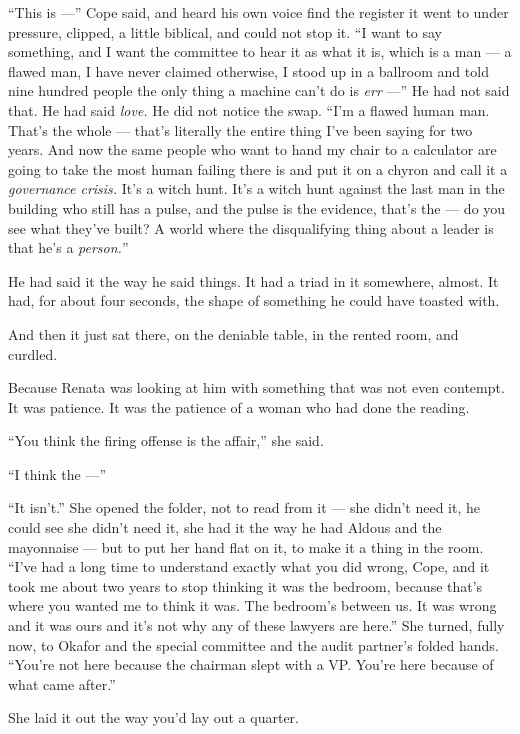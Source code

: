 \documentclass[11pt,openany]{book}
\newcommand{\scenebreak}{\par\vspace{0.5\baselineskip}\begin{center}\textasteriskcentered\quad\textasteriskcentered\quad\textasteriskcentered\end{center}\vspace{0.5\baselineskip}\par}
\begin{document}
``This is ---'' Cope said, and heard his own voice find the register it went to under pressure, clipped, a little biblical, and could not stop it. ``I want to say something, and I want the committee to hear it as what it is, which is a man --- a flawed man, I have never claimed otherwise, I stood up in a ballroom and told nine hundred people the only thing a machine can't do is \textit{err} ---'' He had not said that. He had said \textit{love.} He did not notice the swap. ``I'm a flawed human man. That's the whole --- that's literally the entire thing I've been saying for two years. And now the same people who want to hand my chair to a calculator are going to take the most human failing there is and put it on a chyron and call it a \textit{governance crisis.} It's a witch hunt. It's a witch hunt against the last man in the building who still has a pulse, and the pulse is the evidence, that's the --- do you see what they've built? A world where the disqualifying thing about a leader is that he's a \textit{person.}''

He had said it the way he said things. It had a triad in it somewhere, almost. It had, for about four seconds, the shape of something he could have toasted with.

And then it just sat there, on the deniable table, in the rented room, and curdled.

Because Renata was looking at him with something that was not even contempt. It was patience. It was the patience of a woman who had done the reading.

``You think the firing offense is the affair,'' she said.

``I think the ---''

``It isn't.'' She opened the folder, not to read from it --- she didn't need it, he could see she didn't need it, she had it the way he had Aldous and the mayonnaise --- but to put her hand flat on it, to make it a thing in the room. ``I've had a long time to understand exactly what you did wrong, Cope, and it took me about two years to stop thinking it was the bedroom, because that's where you wanted me to think it was. The bedroom's between us. It was wrong and it was ours and it's not why any of these lawyers are here.'' She turned, fully now, to Okafor and the special committee and the audit partner's folded hands. ``You're not here because the chairman slept with a VP. You're here because of what came after.''


\scenebreak


She laid it out the way you'd lay out a quarter.
\end{document}
